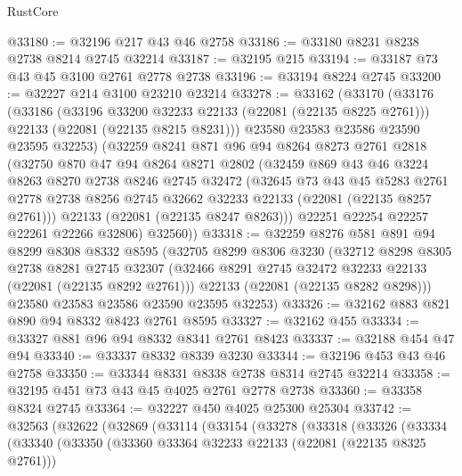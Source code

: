 \begin{lexlean}{RustCore}
\begin{coremodule}
@33180 := @32196 @217 @43 @46 @2758
@33186 := @33180 @8231 @8238 @2738 @8214 @2745 @32214
@33187 := @32195 @215
@33194 := @33187 @73 @43 @45 @3100 @2761 @2778 @2738
@33196 := @33194 @8224 @2745
@33200 := @32227 @214 @3100 @23210 @23214
@33278 := @33162
    (@33170
      (@33176
        (@33186
          (@33196 @33200 @32233 @22133 (@22081 (@22135 @8225 @2761)))
          @22133
          (@22081 (@22135 @8215 @8231)))
        @23580
        @23583
        @23586
        @23590
        @23595
        @32253)
      (@32259
        @8241
        @871
        @96
        @94
        @8264
        @8273
        @2761
        @2818
        (@32750
          @870
          @47
          @94
          @8264
          @8271
          @2802
          (@32459
            @869
            @43
            @46
            @3224
            @8263
            @8270
            @2738
            @8246
            @2745
            @32472
            (@32645
              @73
              @43
              @45
              @5283
              @2761
              @2778
              @2738
              @8256
              @2745
              @32662
              @32233
              @22133
              (@22081 (@22135 @8257 @2761)))
            @22133
            (@22081 (@22135 @8247 @8263)))
          @22251
          @22254
          @22257
          @22261
          @22266
          @32806)
        @32560))
@33318 := @32259
    @8276
    @581
    @891
    @94
    @8299
    @8308
    @8332
    @8595
    (@32705
      @8299
      @8306
      @3230
      (@32712
        @8298
        @8305
        @2738
        @8281
        @2745
        @32307
        (@32466 @8291 @2745 @32472 @32233 @22133 (@22081 (@22135 @8292 @2761)))
        @22133
        (@22081 (@22135 @8282 @8298)))
      @23580
      @23583
      @23586
      @23590
      @23595
      @32253)
@33326 := @32162 @883 @821 @890 @94 @8332 @8423 @2761 @8595
@33327 := @32162 @455
@33334 := @33327 @881 @96 @94 @8332 @8341 @2761 @8423
@33337 := @32188 @454 @47 @94
@33340 := @33337 @8332 @8339 @3230
@33344 := @32196 @453 @43 @46 @2758
@33350 := @33344 @8331 @8338 @2738 @8314 @2745 @32214
@33358 := @32195 @451 @73 @43 @45 @4025 @2761 @2778 @2738
@33360 := @33358 @8324 @2745
@33364 := @32227 @450 @4025 @25300 @25304
@33742 := @32563
    (@32622
      (@32869
        (@33114
          (@33154
            (@33278
              (@33318
                (@33326
                  (@33334
                    (@33340
                      (@33350
                        (@33360 @33364 @32233 @22133 (@22081 (@22135 @8325 @2761)))

\end{coremodule}
\end{lexlean}
